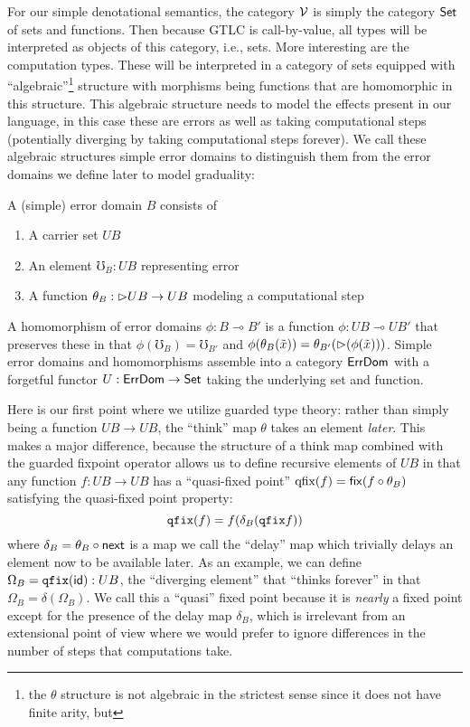 For our simple denotational semantics, the category $\mathcal{V}$ is simply
the category $\mathsf{Set}$ of sets and functions. Then because GTLC is
call-by-value, all types will be interpreted as objects of this
category, i.e., sets. More interesting are the computation
types. These will be interpreted in a category of sets equipped with
``algebraic''\footnote{the $\theta$ structure is not algebraic in the
strictest sense since it does not have finite arity, but } structure
with morphisms being functions that are homomorphic in this structure.
This algebraic structure needs to model the effects present in our language,
in this case these are errors as well as taking computational steps
(potentially diverging by taking computational steps forever).
%
We call these algebraic structures simple error domains to distinguish
them from the error domains we define later to model graduality:
\begin{definition}
  A (simple) error domain $B$ consists of
  \begin{enumerate}
  \item A carrier set $UB$
  \item An element $\mho_{B} : UB$ representing error
  \item A function $\theta_B : {{\vartriangleright}} UB \to UB$ modeling a computational step
  \end{enumerate}
  A homomorphism of error domains $\phi : B \multimap B'$ is a
  function $\phi : UB \multimap UB'$ that preserves these in that
  $\phi(\mho_B) = \mho_{B'}$ and $\phi(\theta_{B}(\tilde{x})) =
  \theta_{B'}({\vartriangleright} (\phi(\tilde{x})))$.  Simple error domains and
  homomorphisms assemble into a category $\mathsf{ErrDom}$ with a forgetful
  functor $U : \mathsf{ErrDom} \to \mathsf{Set}$ taking the underlying set and
  function.
\end{definition}
Here is our first point where we utilize guarded type theory: rather
than simply being a function $UB \to UB$, the ``think'' map $\theta$
takes an element \emph{later}. This makes a major difference, because
the structure of a think map combined with the guarded fixpoint
operator allows us to define recursive elements of $UB$ in that any
function $f : UB \to UB$ has a ``quasi-fixed point'' $\textrm{qfix}(f)
= \mathsf{fix}(f \circ \theta_B)$ satisfying the quasi-fixed point property:
\[ \texttt{qfix}(f) = f(\delta_B(\texttt{qfix} f)) \]
where $\delta_B = \theta_B \circ \mathsf{next}$ is a map we call the ``delay''
map which trivially delays an element now to be available later.  As
an example, we can define $\Omega_B = \texttt{qfix}(\mathsf{id}) : UB$, the
``diverging element'' that ``thinks forever'' in that $\Omega_B =
\delta(\Omega_B)$. We call this a ``quasi'' fixed point because it is
\emph{nearly} a fixed point except for the presence of the delay map
$\delta_B$, which is irrelevant from an extensional point of view
where we would prefer to ignore differences in the number of steps
that computations take.

